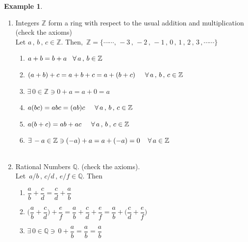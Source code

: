 \documentclass[11pt,a4paper]{article}
\theoremstyle{definition}
\newtheorem{exa}[thm]{Example}
\begin{document}
\begin{exa}
\begin{enumerate}
\item Integers $\mathbb{Z}$ form a ring with respect to the usual addition and multiplication  (check the axioms)\\

Let $a\, , \, b\, , \, c\in \mathbb{Z}$. Then, $\, \mathbb{Z} = \big\{\cdots\cdots,\, -3\, , \, -2\, , \, -1\, , \, 0\, , \, 1\, , \, 2\, , \, 3\, , \cdots\cdots\big\}$
\begin{enumerate}
     \item[(i)] $a + b = b + a\hspace{0.3cm} \forall\, a\, , \, b\in \mathbb{Z}$
     \item[(ii)] $(a + b) + c = a  + b + c = a + (b + c) \hspace{0.5cm} \forall\, a\, , \, b\, , \, c\in \mathbb{Z}$
     \item[(iii)] $\exists\, 0\in \mathbb{Z} \ni 0 + a = a + 0 = a$
     \item[(iv)] $ a(bc) = abc = (ab)c \hspace{0.5cm} \forall\, a\, , \, b\, , \, c\in \mathbb{Z}$
     \item[(v)] $a (b+c) = ab + ac \hspace{0.5cm} \forall\, a\, , \, b\, , \, c\in \mathbb{Z}$
     \item[(vi)] $\exists\, -a\in \mathbb{Z} \ni (-a) + a = a + (-a) = 0\hspace{0.4cm} \forall\, a\in \mathbb{Z}$\\\\
\end{enumerate}

\item Rational Numbers $\mathbb{Q}$.  (check the axioms).\\

Let $\, a/b\, , \, c/d\, , \, e/f\in \mathbb{Q}$. Then
\begin{enumerate}
     \item[(i)] $\dfrac{a}{b} + \dfrac{c}{d} = \dfrac{c}{d} + \dfrac{a}{b}$\\
     
     \item[(ii)] $\Big(\dfrac{a}{b} + \dfrac{c}{d}\Big) + \dfrac{e}{f} = \dfrac{a}{b} + \dfrac{c}{d} + \dfrac{e}{f} = \dfrac{a}{b} + \Big(\dfrac{c}{d} + \dfrac{e}{f}\Big)$\\
     
     \item[(iii)] $\exists\, 0\in \mathbb{Q} \ni \, 0 + \dfrac{a}{b} = \dfrac{a}{b} = \dfrac{a}{b}$\\
     

\end{enumerate}
\end{enumerate}
\end{exa}
\end{document}
